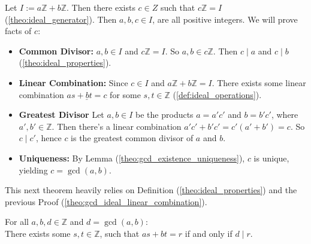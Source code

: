 \begin{Proof}

    \label{proof:gcd_ideal_linear_combination}

    Let $I:=a\mathbb{Z} + b\mathbb{Z}$. Then there exists $c\in Z$ such that $c\mathbb{Z} = I$ (\ref{theo:ideal_generator}). Then $a,b,c\in I$, are all
    positive integers. We will prove facts of $c$:
    \begin{itemize}
        \item \textbf{Common Divisor: }$a,b\in I$ and $c\mathbb{Z}=I$. So $a,b\in c\mathbb{Z}$. Then $c\mid a$ and $c\mid b$ (\ref{theo:ideal_properties}).
        \item \textbf{Linear Combination:} Since $c\in I$ and $a\mathbb{Z} + b\mathbb{Z} = I$. There exists some linear combination $\underline{as+bt=c}$ for some $s,t\in\mathbb{Z}$ (\ref{def:ideal_operations}).
        \item \textbf{Greatest Divisor} Let $a,b\in I$ be the products $a=a'c'$ and $b=b'c'$, where $a',b'\in\mathbb{Z}$.
              Then there's a linear combination $a'c'+b'c'=c'(a'+b')=c$. So $c\mid c'$, hence $c$ is the greatest common divisor of $a$ and $b$.
        \item \textbf{Uniqueness:} By Lemma (\ref{theo:gcd_existence_uniqueness}), $c$ is unique, yielding $c=\gcd(a,b)$.
    \end{itemize}
\end{Proof}

\newpage

\noindent
This next theorem heavily relies on Definition (\ref{theo:ideal_properties}) and the previous Proof (\ref{theo:gcd_ideal_linear_combination}).
\begin{theo}

    \label{theo:element_linear_combinations}

    For all \(a, b,d \in \mathbb{Z}\) and $d=\gcd(a,b)$:\\
    There exists some \(s, t \in \mathbb{Z}\), such that \(as + bt = r\) if and only if $d\mid r$.
        
\end{theo}


